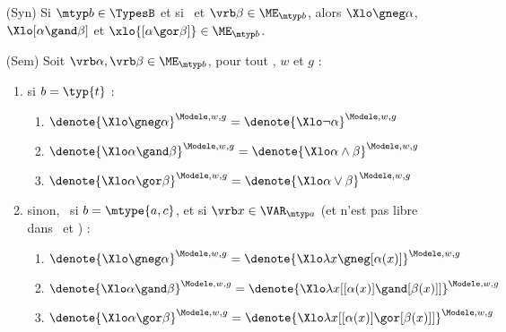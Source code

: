 \begin{defi}\label{d:ConnGen}
\begin{itemize}
\item[\small(Syn)]  Si $\mtyp b \in \TypesB$ et si \vrb\alpha\ et $\vrb\beta\in\ME_{\mtyp b}$, alors
  $\Xlo\gneg\alpha$, $\Xlo[\alpha\gand\beta]$ et $\xlo{[\alpha\gor\beta]}\in\ME_{\mtyp b}$.
\item[\small(Sem)]  Soit %
  $\vrb\alpha,\vrb\beta \in \ME_{\mtyp b}$, pour tout \Modele, $w$ et $g$ :
\begin{enumerate}
\item si $b=\typ{t}$ :
  \begin{enumerate}
  \item $\denote{\Xlo\gneg \alpha}^{\Modele,w,g} = \denote{\Xlo\neg \alpha}^{\Modele,w,g}$
  \item $\denote{\Xlo\alpha \gand \beta}^{\Modele,w,g} = \denote{\Xlo\alpha \wedge \beta}^{\Modele,w,g}$
  \item $\denote{\Xlo\alpha\gor \beta}^{\Modele,w,g} = \denote{\Xlo\alpha\vee \beta}^{\Modele,w,g}$
  \end{enumerate}
\item sinon, \ie\ si  $b=\mtype{a,c}$, et si $\vrb x \in \VAR_{\mtyp a}$ (et n'est pas libre dans \vrb\alpha\ et \vrb\beta) :
  \begin{enumerate}
  \item $\denote{\Xlo\gneg \alpha}^{\Modele,w,g} = \denote{\Xlo\lambda x \gneg [\alpha(x)]}^{\Modele,w,g}$
  \item $\denote{\Xlo\alpha \gand \beta}^{\Modele,w,g} = \denote{\Xlo\lambda x [[\alpha(x)] \gand [\beta(x)]]}^{\Modele,w,g}$
  \item $\denote{\Xlo\alpha\gor \beta}^{\Modele,w,g} = \denote{\Xlo\lambda x [[\alpha(x)] \gor [\beta(x)]]}^{\Modele,w,g}$ 
  \end{enumerate}
\end{enumerate}
\end{itemize}
\end{defi}


